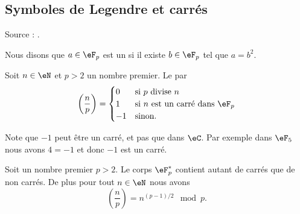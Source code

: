 \subsection{Symboles de Legendre et carrés}

Source : \cite{RecQuadVento}.

Nous disons que \( a\in \eF_p\) est un  si il existe \( b\in \eF_p\) tel que \( a=b^2\).

\begin{definition}
    Soit \( n\in \eN\) et \( p>2\) un nombre premier. Le  par
    \begin{equation}
        \left( \frac{ n }{ p } \right)=\begin{cases}
            0    &   \text{si \( p\) divise \( n\)}\\
            1    &    \text{si \( n\) est un carré dans \( \eF_p\)}\\
            -1    &    \text{sinon}.
        \end{cases}
    \end{equation}
\end{definition}

Note que \( -1\) peut être un carré, et pas que dans \( \eC\). Par exemple dans \( \eF_5\) nous avons \( 4=-1\) et donc \( -1\) est un carré.

\begin{proposition} \label{PropcGsJjk}
    Soit un nombre premier \( p>2\). Le corps \( \eF_p^*\) contient autant de carrés que de non carrés. De plus pour tout \( n\in \eN\) nous avons
    \begin{equation}    \label{Eqbcugos}
        \left(\frac{n}{p}\right)=n^{(p-1)/2}\mod p.
    \end{equation}
\end{proposition}

